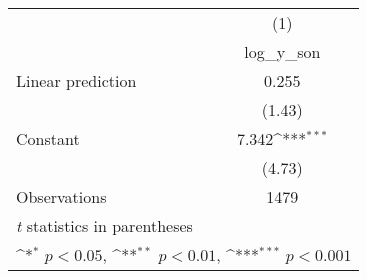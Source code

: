 {
\def\sym#1{\ifmmode^{#1}\else\(^{#1}\)\fi}
\begin{tabular}{l*{1}{c}}
\hline\hline
                    &\multicolumn{1}{c}{(1)}\\
                    &\multicolumn{1}{c}{log\_y\_son}\\
\hline
Linear prediction   &       0.255         \\
                    &      (1.43)         \\
[1em]
Constant            &       7.342\sym{***}\\
                    &      (4.73)         \\
\hline
Observations        &        1479         \\
\hline\hline
\multicolumn{2}{l}{\footnotesize \textit{t} statistics in parentheses}\\
\multicolumn{2}{l}{\footnotesize \sym{*} \(p<0.05\), \sym{**} \(p<0.01\), \sym{***} \(p<0.001\)}\\
\end{tabular}
}
